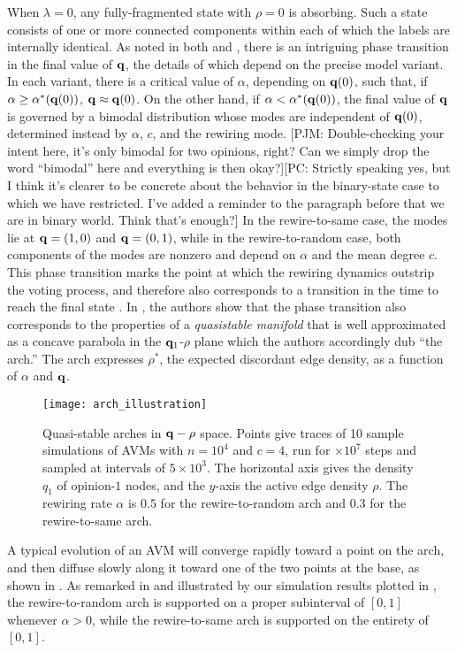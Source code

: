 \documentclass[review, onefignum, onetabnum]{siamart171218}
\newcommand{\pjm}[1]{{\color{blue}[PJM: #1]}}
\newcommand{\pc}[1]{{\color{comment_purple}[PC: #1]}}
\begin{document}
		When $\lambda = 0$, any fully-fragmented state with $\rho = 0$ is absorbing. 
		Such a state consists of one or more connected components within each of which the labels are internally identical. 
		As noted in both \cite{Holme2006} and \cite{Durrett2012}, there is an intriguing phase transition in the final value of $\mathbf{q}$, the details of which depend on the precise model variant. 
		In each variant, there is a critical value of $\alpha$, depending on $\mathbf{q}(0)$, such that, if $\alpha \geq \alpha^*(\mathbf{q}(0))$, $\mathbf{q} \approx \mathbf{q}(0)$. 
		On the other hand, if $\alpha < \alpha^*(\mathbf{q}(0))$, the final value of $\mathbf{q}$ is governed by a bimodal distribution whose modes are independent of $\mathbf{q}(0)$, determined instead by $\alpha$, $c$, and the rewiring mode. \pjm{Double-checking your intent here, it's only bimodal for two opinions, right? Can we simply drop the word ``bimodal'' here and everything is then okay?}\pc{Strictly speaking yes, but I think it's clearer to be concrete about the behavior in the binary-state case to which we have restricted. I've added a reminder to the paragraph before that we are in binary world. Think that's enough?}
		In the rewire-to-same case, the modes lie at $\mathbf{q} = (1,0)$ and $\mathbf{q} = (0,1)$, while in the rewire-to-random case, both components of the modes are nonzero and depend on $\alpha$ and the mean degree $c$. 
		This phase transition marks the point at which the rewiring dynamics outstrip the voting process, and therefore also corresponds to a transition in the time to reach the final state \cite{Holme2006,Rogers2013}. 
		In \cite{Durrett2012}, the authors show that the phase transition also corresponds to the properties of a \emph{quasistable manifold} that is well approximated as a concave parabola in the $\mathbf{q}_1$-$\rho$ plane which the authors accordingly dub ``the arch.'' 
		The arch expresses $\rho^*$, the expected discordant edge density, as a function of $\alpha$ and $\mathbf{q}$. 
		\begin{figure}
		 	\centering
		 	\texttt{[image: arch\_illustration]}
		 	\caption{Quasi-stable arches in $\mathbf{q}-\rho$ space. 
		 	Points give traces of 10 sample simulations of AVMs with $n = 10^4$ and $c = 4$, run for $\times 10^7$ steps and sampled at intervals of $5\times 10^3$. 
		 	The horizontal axis gives the density $q_1$ of opinion-$1$ nodes, and the $y$-axis the active edge density $\rho$. 
		 	The rewiring rate $\alpha$ is $0.5$ for the rewire-to-random arch and $0.3$ for the rewire-to-same arch.} 
		 	\label{fig:arch_illustration}
		\end{figure} 
		A typical evolution of an AVM will converge rapidly toward a point on the arch, and then diffuse slowly along it toward one of the two points at the base, as shown in .
		As remarked in \cite{Durrett2012} and illustrated by our simulation results plotted in  , the rewire-to-random arch is supported on a proper subinterval of $[0,1]$ whenever $\alpha >0$, while the rewire-to-same arch is supported on the entirety of $[0,1]$. 
		
\end{document}
